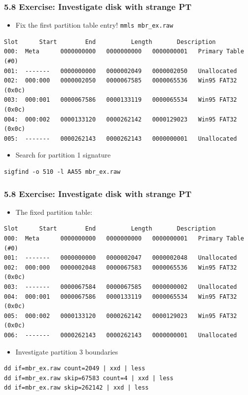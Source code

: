 \begin{frame}[fragile]
  \frametitle{5.8 Exercise: Investigate disk with  strange PT}
    \begin{itemize}
        \item Fix the first partition table entry! \texttt{mmls mbr\_ex.raw}
    \end{itemize}
  \begin{lstlisting}[basicstyle=\tiny]
        Slot      Start        End          Length       Description
000:  Meta      0000000000   0000000000   0000000001   Primary Table (#0)
001:  -------   0000000000   0000002049   0000002050   Unallocated
002:  000:000   0000002050   0000067585   0000065536   Win95 FAT32 (0x0c)
003:  000:001   0000067586   0000133119   0000065534   Win95 FAT32 (0x0c)
004:  000:002   0000133120   0000262142   0000129023   Win95 FAT32 (0x0c)
005:  -------   0000262143   0000262143   0000000001   Unallocated
  \end{lstlisting}
    \begin{itemize}
        \item Search for partition 1 signature
    \end{itemize}
  \begin{lstlisting}[basicstyle=\tiny]
sigfind -o 510 -l AA55 mbr_ex.raw
  \end{lstlisting}
\end{frame}


\begin{frame}[fragile]
  \frametitle{5.8 Exercise: Investigate disk with  strange PT}
    \begin{itemize}
        \item The fixed partition table:
    \end{itemize}
  \begin{lstlisting}[basicstyle=\tiny]
      Slot      Start        End          Length       Description
000:  Meta      0000000000   0000000000   0000000001   Primary Table (#0)
001:  -------   0000000000   0000002047   0000002048   Unallocated
002:  000:000   0000002048   0000067583   0000065536   Win95 FAT32 (0x0c)
003:  -------   0000067584   0000067585   0000000002   Unallocated
004:  000:001   0000067586   0000133119   0000065534   Win95 FAT32 (0x0c)
005:  000:002   0000133120   0000262142   0000129023   Win95 FAT32 (0x0c)
006:  -------   0000262143   0000262143   0000000001   Unallocated
  \end{lstlisting}
    \begin{itemize}
        \item Investigate partition 3 boundaries
    \end{itemize}
  \begin{lstlisting}[basicstyle=\tiny]
dd if=mbr_ex.raw count=2049 | xxd | less
dd if=mbr_ex.raw skip=67583 count=4 | xxd | less
dd if=mbr_ex.raw skip=262142 | xxd | less
  \end{lstlisting}
\end{frame}


